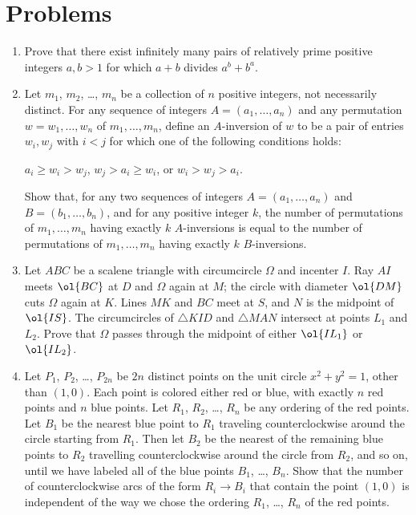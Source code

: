 \documentclass[11pt]{scrartcl}
\begin{document}
\section{Problems}
\begin{enumerate}[\bfseries 1.]
\item %
Prove that there exist infinitely many pairs of
relatively prime positive integers $a,b > 1$
for which $a+b$ divides $a^b+b^a$.

\item %
Let $m_1$, $m_2$, \dots, $m_n$ be a collection of $n$ positive integers,
not necessarily distinct.
For any sequence of integers $A = (a_1, \dots, a_n)$
and any permutation $w = w_1, \dots, w_n$ of $m_1, \dots, m_n$,
define an $A$-inversion of $w$ to be a pair of
entries $w_i, w_j$ with $i < j$ for which
one of the following conditions holds:
\begin{itemize}
  \ii $a_i \ge w_i > w_j$,
    \ii $w_j > a_i \ge w_i$, or
    \ii $w_i > w_j > a_i$.
\end{itemize}
Show that, for any two sequences of integers
$A = (a_1, \dots, a_n)$ and $B = (b_1, \dots, b_n)$,
and for any positive integer $k$, the number of permutations
of $m_1, \dots, m_n$ having exactly $k$ $A$-inversions
is equal to the number of permutations of $m_1, \dots, m_n$
having exactly $k$ $B$-inversions.

\item %
Let $ABC$ be a scalene triangle with circumcircle $\Omega$ and incenter $I$.
Ray $AI$ meets $\ol{BC}$ at $D$ and $\Omega$ again at $M$;
the circle with diameter $\ol{DM}$ cuts $\Omega$ again at $K$.
Lines $MK$ and $BC$ meet at $S$, and $N$ is the midpoint of $\ol{IS}$.
The circumcircles of $\triangle KID$ and $\triangle MAN$
intersect at points $L_1$ and $L_2$.
Prove that $\Omega$ passes through the midpoint of either $\ol{IL_1}$ or $\ol{IL_2}$.

\item %
Let $P_1$, $P_2$, \dots, $P_{2n}$ be $2n$ distinct points on the
unit circle $x^2+y^2=1$, other than $(1,0)$.
Each point is colored either red or blue,
with exactly $n$ red points and $n$ blue points.
Let $R_1$, $R_2$, \dots, $R_n$ be any ordering of the red points.
Let $B_1$ be the nearest blue point to $R_1$ traveling
counterclockwise around the circle starting from $R_1$.
Then let $B_2$ be the nearest of the remaining blue points to $R_2$
travelling counterclockwise around the circle from $R_2$, and so on,
until we have labeled all of the blue points $B_1$, \dots, $B_n$.
Show that the number of counterclockwise arcs of the form $R_i \to B_i$
that contain the point $(1,0)$ is independent of the way we chose the
ordering $R_1$, \dots, $R_n$ of the red points.


\end{enumerate}
\end{document}
